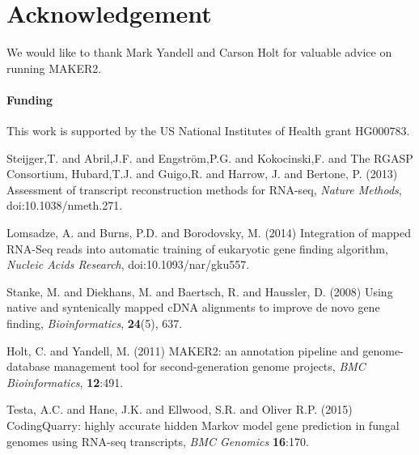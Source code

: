 \documentclass{bioinfo}
\begin{document}
\section*{Acknowledgement}

We would like to thank Mark Yandell and Carson Holt for valuable advice on running MAKER2.

\paragraph{Funding\textcolon} This work is supported by the US National Institutes of Health grant HG000783.

%
%
%
%
%
%
%
%
%


\begin{thebibliography}{}
 Steijger,T. and Abril,J.F. and Engstr\"{o}m,P.G. and Kokocinski,F. and The RGASP Consortium, Hubard,T.J. and Guigo,R. and Harrow, J. and Bertone, P. (2013) Assessment of transcript reconstruction methods for
 RNA-seq, {\it Nature Methods}, doi:10.1038/nmeth.271.

 Lomsadze, A. and Burns, P.D. and Borodovsky, M. (2014) Integration of mapped RNA-Seq reads into automatic training of eukaryotic gene finding algorithm, {\it Nucleic Acids Research}, doi:10.1093/nar/gku557.

Stanke, M. and Diekhans, M. and Baertsch, R. and Haussler, D. (2008) Using native and syntenically mapped cDNA alignments to improve de novo gene finding, \textit{Bioinformatics}, \textbf{24}(5), 637.

 Holt, C. and Yandell, M. (2011) MAKER2: an annotation pipeline and genome-database management tool for second-generation genome projects, \textit{BMC Bioinformatics}, \textbf{12}:491.

 Testa, A.C. and Hane, J.K. and Ellwood, S.R. and Oliver R.P. (2015) CodingQuarry: highly accurate hidden Markov model gene prediction in fungal genomes using RNA-seq transcripts, \textit{BMC Genomics} \textbf{16}:170.



\end{thebibliography}
\end{document}

